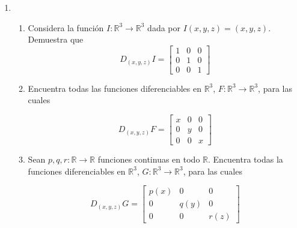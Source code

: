 \documentclass{article}
\theoremstyle{definition}
\begin{document}
\begin{enumerate}
  \item
    \begin{enumerate}
    \item Considera la funci\'on $I:\mathbb{R}^3\to \mathbb{R}^3$ dada por $I(x,y,z)=(x,y,z)$.
      Demuestra que
      $$
      D_{(x,y,z)}I=\left[
        \begin{array}{ccc}
          1 & 0 & 0 \\
          0 & 1 & 0 \\
          0 & 0 & 1
        \end{array}
      \right]
      $$
    \item Encuentra todas las funciones diferenciables en $\mathbb{R}^3$,
      $F:\mathbb{R}^3 \to \mathbb{R}^3$, para las cuales

      $$
      D_{(x,y,z)}F=\left[
        \begin{array}{ccc}
          x & 0 & 0 \\
          0 & y & 0 \\
          0 & 0 & x
        \end{array}
      \right]
      $$

    \item Sean $p,q,r:\mathbb{R}\to \mathbb{R}$ funciones continuas en todo $\mathbb{R}$. Encuentra
      todas la funciones diferenciables en $\mathbb{R}^3$, $G:\mathbb{R}^3 \to \mathbb{R}^3$, para
      las cuales

      $$
      D_{(x,y,z)}G=\left[
        \begin{array}{ccc}
          p(x) & 0 & 0 \\
          0 & q(y) & 0 \\
          0 & 0 & r(z)
        \end{array}
      \right]
      $$

      
    \end{enumerate}

    \end{enumerate}

       
\end{document}
